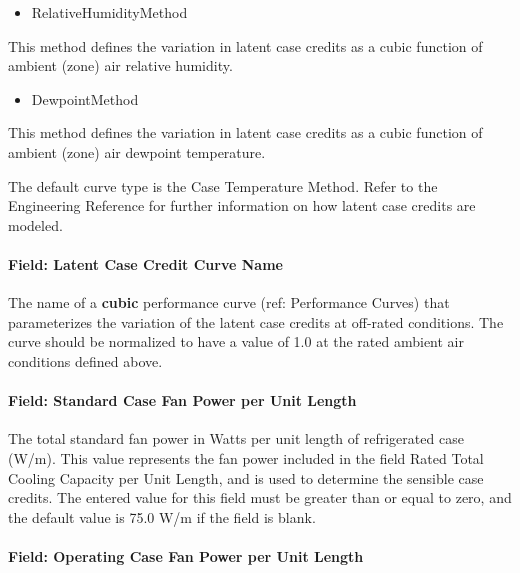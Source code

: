 \begin{itemize}
\tightlist
\item
  RelativeHumidityMethod
\end{itemize}

This method defines the variation in latent case credits as a cubic function of ambient (zone) air relative humidity.

\begin{itemize}
\tightlist
\item
  DewpointMethod
\end{itemize}

This method defines the variation in latent case credits as a cubic function of ambient (zone) air dewpoint temperature.

The default curve type is the Case Temperature Method. Refer to the Engineering Reference for further information on how latent case credits are modeled.

\paragraph{Field: Latent Case Credit Curve Name}\label{field-latent-case-credit-curve-name}

The name of a \textbf{cubic} performance curve (ref: Performance Curves) that parameterizes the variation of the latent case credits at off-rated conditions. The curve should be normalized to have a value of 1.0 at the rated ambient air conditions defined above.

\paragraph{Field: Standard Case Fan Power per Unit Length}\label{field-standard-case-fan-power-per-unit-length}

The total standard fan power in Watts per unit length of refrigerated case (W/m). This value represents the fan power included in the field Rated Total Cooling Capacity per Unit Length, and is used to determine the sensible case credits. The entered value for this field must be greater than or equal to zero, and the default value is 75.0 W/m if the field is blank.

\paragraph{Field: Operating Case Fan Power per Unit Length}\label{field-operating-case-fan-power-per-unit-length}

